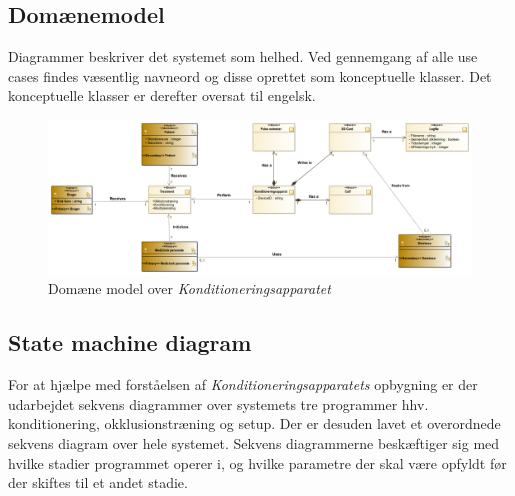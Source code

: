 \subsection{Domænemodel}
Diagrammer beskriver det systemet som helhed. Ved gennemgang af alle use cases findes væsentlig navneord og disse oprettet som konceptuelle klasser. Det konceptuelle klasser er derefter oversat til engelsk. \\
\begin{figure}[H]
	\includegraphics[width=\textwidth]{SystemArkitektur/pdfs/DomainModel.png}
	\caption{Domæne model over \textit{Konditioneringsapparatet}}
\end{figure}


\newpage
\subsection{State machine diagram}
For at hjælpe med forståelsen af \textit{Konditioneringsapparatets} opbygning er der udarbejdet sekvens diagrammer over systemets tre programmer hhv. konditionering, okklusionstræning og setup. Der er desuden lavet et overordnede sekvens diagram over hele systemet. 
Sekvens diagrammerne beskæftiger sig med hvilke stadier programmet operer i, og hvilke parametre der skal være opfyldt før der skiftes til et andet stadie. 
 
